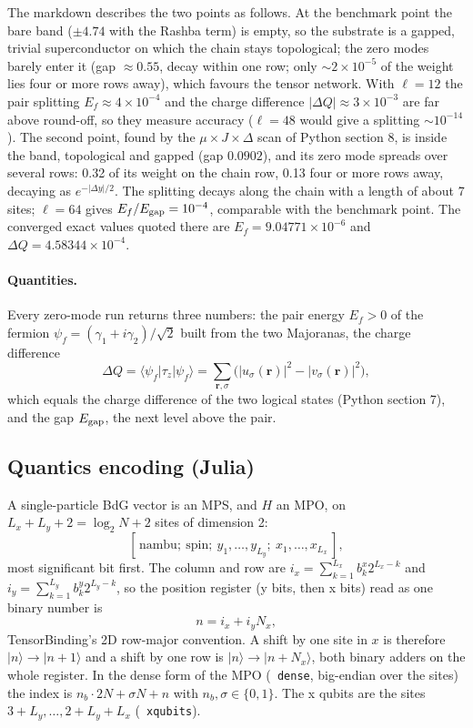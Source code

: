 \documentclass[11pt]{article}
\renewcommand{\code}[1]{\texttt{\hyphenchar\font=-1 #1}}
\newcommand{\ket}[1]{|#1\rangle}
\newcommand{\bra}[1]{\langle#1|}
\begin{document}
The markdown describes the two points as follows. At the benchmark point the bare band ($\pm4.74$ with the Rashba term) is empty,
so the substrate is a gapped, trivial superconductor on which the chain stays topological; the zero modes barely enter it (gap
$\approx0.55$, decay within one row; only $\sim2\times10^{-5}$ of the weight lies four or more rows away), which favours the tensor network.
With $\ell = 12$ the pair splitting $E_f\approx4\times10^{-4}$ and the charge difference $|\Delta Q|\approx3\times10^{-3}$ are far above
round-off, so they measure accuracy ($\ell = 48$ would give a splitting $\sim10^{-14}$). The second point, found by the
$\mu\times J\times\Delta$ scan of Python section 8, is inside the band, topological and gapped (gap $0.0902$), and its zero mode spreads over
several rows: 0.32 of its weight on the chain row, 0.13 four or more rows away, decaying as $e^{-|\Delta y|/2}$. The splitting decays
along the chain with a length of about 7 sites; $\ell = 64$ gives $E_f/E_{\rm gap} = 10^{-4}$, comparable with the benchmark point. The
converged exact values quoted there are $E_f = 9.04771\times10^{-6}$ and $\Delta Q = 4.58344\times10^{-4}$.

\paragraph{Quantities.} Every zero-mode run returns three numbers: the pair energy $E_f>0$ of the fermion
$\psi_f = (\gamma_1+i\gamma_2)/\sqrt2$ built from the two Majoranas, the charge difference
\[
\Delta Q = \bra{\psi_f}\tau_z\ket{\psi_f} = \sum_{\mathbf r,\sigma}\bigl(|u_\sigma(\mathbf r)|^2 - |v_\sigma(\mathbf r)|^2\bigr),
\]
which equals the charge difference of the two logical states (Python section 7), and the gap $E_{\rm gap}$, the next level above the pair.

\subsection{Quantics encoding (Julia)}

A single-particle BdG vector is an MPS, and $H$ an MPO, on $L_x+L_y+2 = \log_2N+2$ sites of dimension 2:
\[
[\,\text{nambu};\ \text{spin};\ y_1,\dots,y_{L_y};\ x_1,\dots,x_{L_x}\,],
\]
most significant bit first. The column and row are $i_x = \sum_{k=1}^{L_x} b^x_k2^{L_x-k}$ and $i_y = \sum_{k=1}^{L_y} b^y_k2^{L_y-k}$, so the
position register (y bits, then x bits) read as one binary number is
\[
n = i_x + i_yN_x,
\]
TensorBinding's 2D row-major convention. A shift by one site in $x$ is therefore $\ket n\to\ket{n+1}$ and a shift by one row is
$\ket n\to\ket{n+N_x}$, both binary adders on the whole register. In the dense form of the MPO (\code{dense}, big-endian over the
sites) the index is $n_b\cdot2N + \sigma N + n$ with $n_b,\sigma\in\{0,1\}$. The x qubits are the sites
$3+L_y,\dots,2+L_y+L_x$ (\code{xqubits}).
\end{document}
